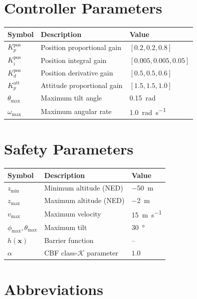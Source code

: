 \section*{Controller Parameters}

\begin{longtable}{@{}p{3cm}p{8cm}p{3cm}@{}}
    \toprule
    \textbf{Symbol} & \textbf{Description} & \textbf{Value} \\
    \midrule
    \endhead
    $K_p^{\text{pos}}$ & Position proportional gain & $[0.2, 0.2, 0.8]$ \\
    $K_i^{\text{pos}}$ & Position integral gain & $[0.005, 0.005, 0.05]$ \\
    $K_d^{\text{pos}}$ & Position derivative gain & $[0.5, 0.5, 0.6]$ \\
    $K_p^{\text{att}}$ & Attitude proportional gain & $[1.5, 1.5, 1.0]$ \\
    $\theta_{\max}$ & Maximum tilt angle & \SI{0.15}{\radian} \\
    $\omega_{\max}$ & Maximum angular rate & \SI{1.0}{\radian\per\second} \\
    \bottomrule
\end{longtable}

\section*{Safety Parameters}

\begin{longtable}{@{}p{3cm}p{8cm}p{3cm}@{}}
    \toprule
    \textbf{Symbol} & \textbf{Description} & \textbf{Value} \\
    \midrule
    \endhead
    $z_{\min}$ & Minimum altitude (NED) & \SI{-50}{\meter} \\
    $z_{\max}$ & Maximum altitude (NED) & \SI{-2}{\meter} \\
    $v_{\max}$ & Maximum velocity & \SI{15}{\meter\per\second} \\
    $\phi_{\max}, \theta_{\max}$ & Maximum tilt & \SI{30}{\degree} \\
    $h(\mathbf{x})$ & Barrier function & -- \\
    $\alpha$ & CBF class-$\mathcal{K}$ parameter & $1.0$ \\
    \bottomrule
\end{longtable}

\section*{Abbreviations}

